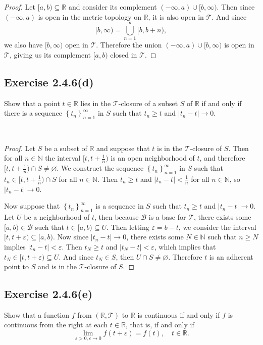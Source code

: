 \documentclass[12pt]{article}
\newenvironment{problem}
    {\begin{lrbox}{\mybox}\begin{minipage}{\textwidth-10pt}}
    {\end{minipage}\end{lrbox}\framebox[6.5in]{\usebox{\mybox}}\\}
\newcommand{\seq}[2]{\left\{#1\right\}_{#2=1}^\infty}
\newcommand{\N}{\mathbb{N}}
\newcommand{\R}{\mathbb{R}}
\let\eps\varepsilon
\let\emptyset\varnothing
\newcommand{\T}{\mathscr{T}}
\newcommand{\B}{\mathscr{B}}
\begin{document}
\begin{proof}
    Let $[a,b)\subseteq\R$ and consider its complement $(-\infty,a)\cup[b,\infty)$. Then since $(-\infty,a)$ is open in the metric topology on $\R$, it is also open in $\T$. And since
    \[[b,\infty) = \bigcup_{n=1}^\infty[b,b+n),\]
    we also have $[b,\infty)$ open in $\T$. Therefore the union $(-\infty,a)\cup[b,\infty)$ is open in $\T$, giving us its complement $[a,b)$ closed in $\T$.
    
\end{proof}

\subsection*{Exercise 2.4.6(d)}
\begin{problem}
    Show that a point $t\in\R$ lies in the $\T$-closure of a subset $S$ of $\R$ if and only if there is a sequence $\seq{t_n}{n}$ in $S$ such that $t_n\geq t$ and $|t_n-t| \to 0$.
\end{problem}

\begin{proof}
    Let $S$ be a subset of $\R$ and suppose that $t$ is in the $\T$-closure of $S$. Then for all $n\in\N$ the interval $[t,t+\frac1n)$ is an open neighborhood of $t$, and therefore $[t,t+\frac1n)\cap S \ne\emptyset$. We construct the sequence $\seq{t_n}{n}$ in $S$ such that $t_n\in[t,t+\frac1n)\cap S$ for all $n\in\N$. Then $t_n\geq t$ and $|t_n-t|<\frac1n$ for all $n\in\N$, so $|t_n-t|\to0$.
    
    Now suppose that $\seq{t_n}{n}$ is a sequence in $S$ such that $t_n\geq t$ and $|t_n-t|\to0$. Let $U$ be a neighborhood of $t$, then because $\B$ is a base for $\T$, there exists some $[a,b)\in\B$ such that $t\in[a,b)\subseteq U$. Then letting $\eps=b-t$, we consider the interval $[t,t+\eps)\subseteq[a,b)$. Now since $|t_n-t|\to0$, there exists some $N\in\N$ such that $n\geq N$ implies $|t_n-t|<\eps$. Then $t_N\geq t$ and $|t_N-t|<\eps$, which implies that $t_N\in[t,t+\eps)\subseteq U$. And since $t_N\in S$, then $U\cap S\ne\emptyset$. Therefore $t$ is an adherent point to $S$ and is in the $\T$-closure of $S$.
    
\end{proof}

\subsection*{Exercise 2.4.6(e)}
\begin{problem}
    Show that a function $f$ from $(\R,\T)$ to $\R$ is continuous if and only if $f$ is continuous from the right at each $t\in\R$, that is, if and only if
    \[\lim_{\eps>0, \eps\to0}f(t+\eps) = f(t), \quad t\in\R.\]
\end{problem}
\end{document}
